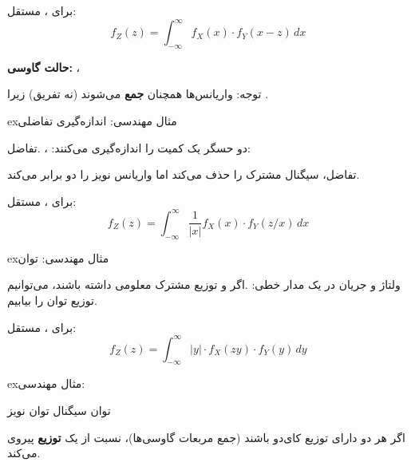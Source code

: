 
برای ،  مستقل:\PSbr{}\[f_Z(z) = \int_{-\infty}^{\infty} f_X(x) \cdot f_Y(x-z) \, dx\]

\textbf{حالت گاوسی:} ، 

توجه: واریانس‌ها همچنان \textbf{جمع} می‌شوند (نه تفریق) زیرا .

\begin{PSbox}[unbreakable]{ex}{مثال مهندسی: اندازه‌گیری تفاضلی}

دو حسگر یک کمیت را اندازه‌گیری می‌کنند: ، .\PSbr{}تفاضل: 

تفاضل، سیگنال مشترک را حذف می‌کند اما واریانس نویز را دو برابر می‌کند.

\end{PSbox}


برای ،  مستقل:\PSbr{}\[f_Z(z) = \int_{-\infty}^{\infty} \frac{1}{|x|} f_X(x) \cdot f_Y(z/x) \, dx\]

\begin{PSbox}[unbreakable]{ex}{مثال مهندسی: توان}

ولتاژ  و جریان  در یک مدار خطی: .\PSbr{}اگر  و  توزیع مشترک معلومی داشته باشند، می‌توانیم توزیع توان را بیابیم.

\end{PSbox}


برای ،  مستقل:\PSbr{}\[f_Z(z) = \int_{-\infty}^{\infty} |y| \cdot f_X(zy) \cdot f_Y(y) \, dy\]

\begin{PSbox}[unbreakable]{ex}{مثال مهندسی: }

 توان سیگنال \lr{/} توان نویز 

اگر هر دو دارای توزیع کای‌دو باشند (جمع مربعات گاوسی‌ها)، نسبت از یک \textbf{توزیع } پیروی می‌کند.

\end{PSbox}

